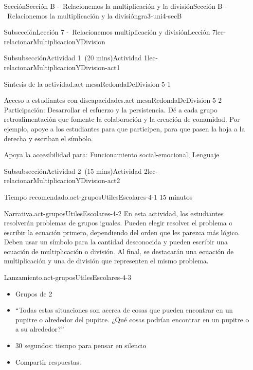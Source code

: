 \documentclass[oneside,10pt,]{article}
\begin{document}
\begin{sectionptx}{Sección}{Sección B -~Relacionemos la multiplicación y la división}{}{Sección B -~Relacionemos la multiplicación y la división}{}{}{gra3-uni4-secB}
\begin{subsectionptx}{Subsección}{Lección 7 -~Relacionemos multiplicación y división}{}{Lección 7}{}{}{lec-relacionarMultiplicacionYDivision}
\begin{subsubsectionptx}{Subsubsección}{Actividad 1~(20 mins)}{}{Actividad 1}{}{}{lec-relacionarMultiplicacionYDivision-act1}
\begin{paragraphs}{Síntesis de la actividad.}{act-mesaRedondaDeDivision-5-1}
\begin{itemize}[label=\textbullet]
\end{itemize}
\end{paragraphs}%
\begin{paragraphs}{Acceso a estudiantes con discapacidades.}{act-mesaRedondaDeDivision-5-2}%
Participación: Desarrollar el esfuerzo y la persistencia. Dé a cada grupo retroalimentación que fomente la colaboración y la creación de comunidad. Por ejemplo, apoye a los estudiantes para que participen, para que pasen la hoja a la derecha y escriban el símbolo.%
\par
Apoya la accesibilidad para: Funcionamiento social-emocional, Lenguaje%
\end{paragraphs}%
\end{subsubsectionptx}
%
%
\typeout{************************************************}
\typeout{************************************************}
%
\begin{subsubsectionptx}{Subsubsección}{Actividad 2~(15 mins)}{}{Actividad 2}{}{}{lec-relacionarMultiplicacionYDivision-act2}
\par
\begin{paragraphs}{Tiempo recomendado.}{act-gruposUtilesEscolares-4-1}%
15 minutos%
\end{paragraphs}%
\begin{paragraphs}{Narrativa.}{act-gruposUtilesEscolares-4-2}%
En esta actividad, los estudiantes resolverán problemas de grupos iguales. Pueden elegir resolver el problema o escribir la ecuación primero, dependiendo del orden que les parezca más lógico. Deben usar un símbolo para la cantidad desconocida y pueden escribir una ecuación de multiplicación o división. Al final, se destacarán una ecuación de multiplicación y una de división que representen el mismo problema.%
\end{paragraphs}%
\begin{paragraphs}{Lanzamiento.}{act-gruposUtilesEscolares-4-3}%
%
\begin{itemize}[label=\textbullet]
\item{}Grupos de 2%
\item{}``Todas estas situaciones son acerca de cosas que pueden encontrar en un pupitre o alrededor del pupitre. ¿Qué cosas podrían encontrar en un pupitre o a su alrededor?''%
\item{}30 segundos: tiempo para pensar en silencio%
\item{}Compartir respuestas.%
\end{itemize}
\end{paragraphs}%

\end{subsubsectionptx}
\end{subsectionptx}
\end{sectionptx}
\end{document}
